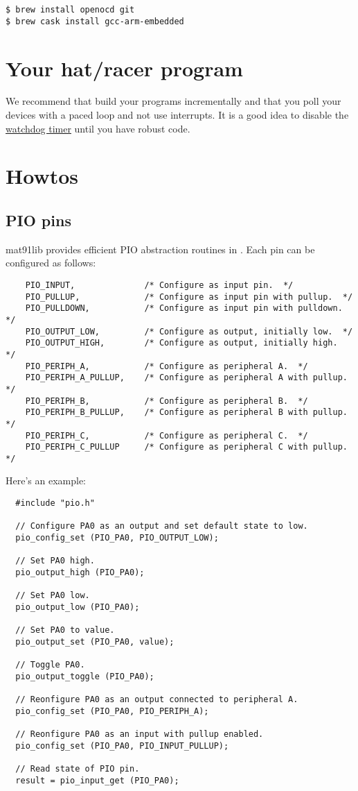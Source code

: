 \begin{verbatim}
$ brew install openocd git
$ brew cask install gcc-arm-embedded
\end{verbatim}


\section{Your hat/racer program}
\label{your-hatracer-program}

We recommend that build your programs incrementally and that you poll
your devices with a paced loop and not use interrupts.  It is a good
idea to disable the \hyperref[watchdog-timer]{watchdog timer} until
you have robust code.

\section{Howtos}
\label{howtos}

\subsection{PIO pins}

mat91lib provides efficient PIO abstraction routines in
.  Each pin can be configured as follows:
%
\begin{verbatim}
    PIO_INPUT,              /* Configure as input pin.  */
    PIO_PULLUP,             /* Configure as input pin with pullup.  */
    PIO_PULLDOWN,           /* Configure as input pin with pulldown.  */
    PIO_OUTPUT_LOW,         /* Configure as output, initially low.  */
    PIO_OUTPUT_HIGH,        /* Configure as output, initially high.  */
    PIO_PERIPH_A,           /* Configure as peripheral A.  */
    PIO_PERIPH_A_PULLUP,    /* Configure as peripheral A with pullup.  */
    PIO_PERIPH_B,           /* Configure as peripheral B.  */
    PIO_PERIPH_B_PULLUP,    /* Configure as peripheral B with pullup.  */
    PIO_PERIPH_C,           /* Configure as peripheral C.  */
    PIO_PERIPH_C_PULLUP     /* Configure as peripheral C with pullup.  */
\end{verbatim}

Here's an example:
%
\begin{verbatim}
  #include "pio.h"

  // Configure PA0 as an output and set default state to low.
  pio_config_set (PIO_PA0, PIO_OUTPUT_LOW);

  // Set PA0 high.
  pio_output_high (PIO_PA0);

  // Set PA0 low.  
  pio_output_low (PIO_PA0);

  // Set PA0 to value.
  pio_output_set (PIO_PA0, value);  

  // Toggle PA0.  
  pio_output_toggle (PIO_PA0);    

  // Reonfigure PA0 as an output connected to peripheral A.
  pio_config_set (PIO_PA0, PIO_PERIPH_A);

  // Reonfigure PA0 as an input with pullup enabled.
  pio_config_set (PIO_PA0, PIO_INPUT_PULLUP);

  // Read state of PIO pin.
  result = pio_input_get (PIO_PA0);
\end{verbatim}

